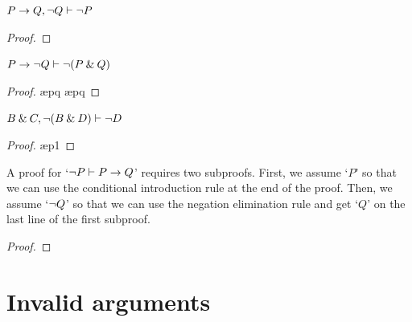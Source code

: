\begin{earg}

\item $P \rightarrow Q, {\neg} Q \vdash {\neg} P$

\begin{proof}
	 \pr{}
	 \pr{}	
	\open
		 \as{}
		 
		 
	\close
	 
\end{proof}
\medskip


\item $P \rightarrow {\neg} Q \vdash {\neg}(P \mathbin{\&} Q)$

\begin{proof}
	 \pr{}	
	\open
		 \as{}
		 \ae{pq}
		 
		 \ae{pq}
	\close
	 
\end{proof}

\filbreak
\item $B \mathbin{\&} C, {\neg}(B \mathbin{\&} D) \vdash {\neg} D$

\begin{proof}
	 \pr{}	
	 \pr{}
	\open
		 \as{}
		 \ae{p1}
		 
		 
	\close
	 
\end{proof}
\medskip

\item A proof for `${\neg} P \vdash P \rightarrow Q$' requires two subproofs. First, we assume `$P$' so that we can use the conditional introduction rule at the end of the proof. Then, we assume `${\neg} Q$' so that we can use the negation elimination rule and get `$Q$' on the last line of the first subproof.

\begin{proof}
	 \pr{}	
	\open
			\as{}
		\open
			 \as{}
			 
			 
		\close
		 
	\close
	 
\end{proof}


\end{earg}



\section{Invalid arguments}

